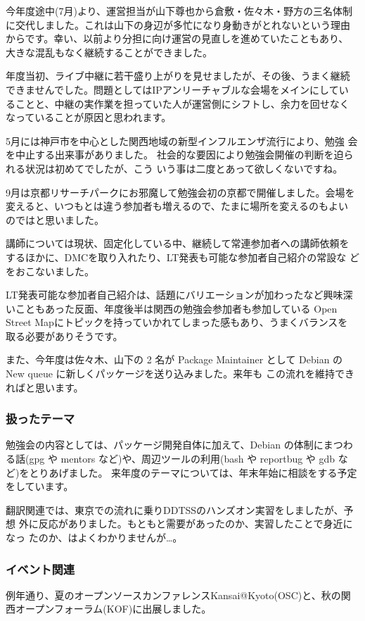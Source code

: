 \documentclass[mingoth,a4paper]{jsarticle}
\begin{document}
今年度途中(7月)より、運営担当が山下尊也から倉敷・佐々木・野方の三名体制
に交代しました。これは山下の身辺が多忙になり身動きがとれないという理由
からです。幸い、以前より分担に向け運営の見直しを進めていたこともあり、
大きな混乱もなく継続することができました。

年度当初、ライブ中継に若干盛り上がりを見せましたが、その後、うまく継続
できませんでした。問題としてはIPアンリーチャブルな会場をメインにしてい
ることと、中継の実作業を担っていた人が運営側にシフトし、余力を回せなく
なっていることが原因と思われます。

5月には神戸市を中心とした関西地域の新型インフルエンザ流行により、勉強
会を中止する出来事がありました。
社会的な要因により勉強会開催の判断を迫られる状況は初めてでしたが、こう
いう事は二度とあって欲しくないですね。

9月は京都リサーチパークにお邪魔して勉強会初の京都で開催しました。会場を
変えると、いつもとは違う参加者も増えるので、たまに場所を変えるのもよい
のではと思いました。

講師については現状、固定化している中、継続して常連参加者への講師依頼を
するほかに、DMCを取り入れたり、LT発表も可能な参加者自己紹介の常設な
どをおこないました。

LT発表可能な参加者自己紹介は、話題にバリエーションが加わったなど興味深
いこともあった反面、年度後半は関西の勉強会参加者も参加している Open
Street Mapにトピックを持っていかれてしまった感もあり、うまくバランスを
取る必要がありそうです。

また、今年度は佐々木、山下の 2 名が Package Maintainer として
Debian の New queue に新しくパッケージを送り込みました。来年も
この流れを維持できればと思います。

\subsubsection{扱ったテーマ}

勉強会の内容としては、パッケージ開発自体に加えて、Debian の体制にまつわ
る話(gpg や mentors など)や、周辺ツールの利用(bash や reportbug や gdb
など)をとりあげました。
来年度のテーマについては、年末年始に相談をする予定をしています。

翻訳関連では、東京での流れに乗りDDTSSのハンズオン実習をしましたが、予想
外に反応がありました。もともと需要があったのか、実習したことで身近になっ
たのか、はよくわかりませんが…。

\subsubsection{イベント関連}
例年通り、夏のオープンソースカンファレンスKansai@Kyoto(OSC)と、秋の関
西オープンフォーラム(KOF)に出展しました。
\end{document}

